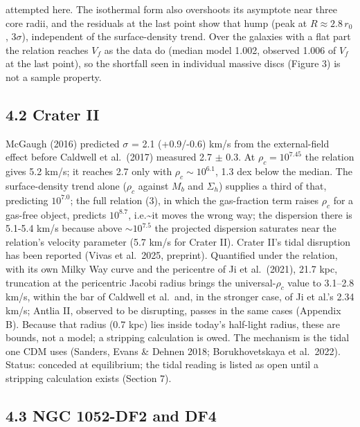 \documentclass[
  10pt,
]{article}
\begin{document}
attempted here. The isothermal form also overshoots its asymptote near three core radii, and the residuals at the last point show that hump (peak at $R\approx2.8\,r_0$, $3\sigma$), independent of the surface-density trend. Over the galaxies with a flat part the relation reaches $V_f$ as the data do (median model 1.002, observed 1.006 of $V_f$ at the last point), so the shortfall seen in individual massive discs (Figure 3) is not a sample property.


\subsection{4.2 Crater II}

McGaugh (2016) predicted $\sigma$ = 2.1 (+0.9/-0.6) km/s
from the external-field effect before Caldwell et al.~(2017) measured
2.7 $\pm$ 0.3. At $\rho_c=10^{7.45}$ the relation gives 5.2 km/s; it reaches
2.7 only with $\rho_c\sim 10^{6.1}$, 1.3 dex below the
median. The surface-density trend
alone ($\rho_c$ against $M_b$ and $\Sigma_h$) supplies a third of that,
predicting $10^{7.0}$; the full relation (3), in which the gas-fraction
term raises $\rho_c$ for a gas-free object, predicts $10^{8.7}$, i.e.\textasciitilde{}it
moves the wrong way; the dispersion there is 5.1-5.4 km/s because above
$\sim 10^{7.5}$ the projected dispersion saturates near the
relation's velocity parameter (5.7 km/s for Crater II). Crater II's tidal
disruption has been reported (Vivas et al.~2025, preprint). Quantified under the relation,
with its own Milky Way curve and the pericentre of Ji et al.~(2021),
21.7 kpc, truncation at the pericentric Jacobi radius brings the
universal-$\rho_c$ value to 3.1--2.8 km/s, within the bar of Caldwell et
al.\ and, in the stronger case, of Ji et al.'s 2.34 km/s; Antlia II, observed
to be disrupting, passes in the same cases (Appendix B). Because that radius
(0.7 kpc) lies inside today's half-light radius, these are bounds, not a
model; a stripping calculation is owed. The mechanism is the tidal one CDM
uses (Sanders, Evans \& Dehnen 2018; Borukhovetskaya et al.~2022). Status: conceded at equilibrium; the tidal reading is listed as open until a stripping calculation exists (Section 7).

\subsection{4.3 NGC 1052-DF2 and DF4}
\end{document}
